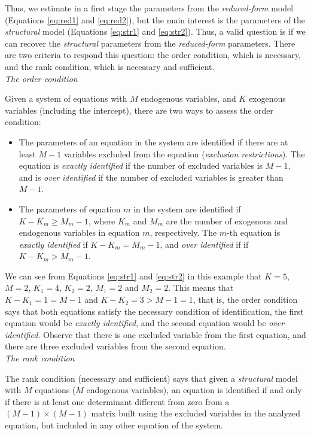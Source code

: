 Thus, we estimate in a first stage the parameters from the \textit{reduced-form} model (Equations \ref{eq:red1} and \ref{eq:red2}), but the main interest is the parameters of the \textit{structural} model (Equations \ref{eq:str1} and \ref{eq:str2}). Thus, a valid question is if we can recover the \textit{structural} parameters from the \textit{reduced-form} parameters. There are two criteria to respond this question: the order condition, which is necessary, and the rank condition, which is necessary and sufficient.\\
 
\textit{The order condition}

Given a system of equations with $M$ endogenous variables, and $K$ exogenous variables (including the intercept), there are two ways to assess the order condition:
\begin{itemize}
	\item The parameters of an equation in the system are identified if there are at least $M-1$ variables excluded from the equation (\textit{exclusion restrictions}). The equation is \textit{exactly identified} if the number of excluded variables is $M-1$, and is \textit{over identified} if the number of excluded variables is greater than $M-1$.
	\item The parameters of equation $m$ in the system are identified if $K-K_m\geq M_m-1$, where $K_m$ and $M_m$ are the number of exogenous and endogenous variables in equation $m$, respectively. The $m$-th equation is \textit{exactly identified} if $K-K_m = M_m-1$, and \textit{over identified} if if $K-K_m > M_m-1$. 
\end{itemize}

We can see from Equations \ref{eq:str1} and \ref{eq:str2} in this example that $K=5$, $M=2$, $K_1=4$, $K_2=2$, $M_1=2$ and $M_2=2$. This means that $K-K_1=1=M-1$ and $K-K_2=3>M-1=1$, that is, the order condition says that both equations satisfy the necessary condition of identification, the first equation would be \textit{exactly identified}, and the second equation would be \textit{over identified}. Observe that there is one excluded variable from the first equation, and there are three excluded variables from the second equation.
\\

\textit{The rank condition}

The rank condition (necessary and sufficient) says that given a \textit{structural} model with $M$ equations ($M$ endogenous variables), an equation is identified if and only if there is at least one determinant different from zero from a $(M-1)\times(M-1)$ matrix built using the excluded variables in the analyzed equation, but included in any other equation of the system.

